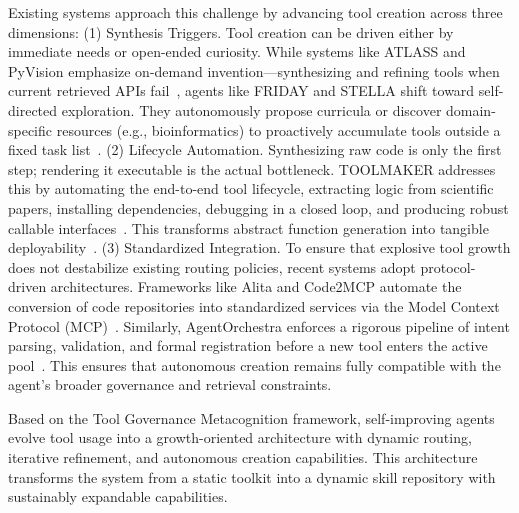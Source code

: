 Existing systems approach this challenge by advancing tool creation across three dimensions: (1) Synthesis Triggers. Tool creation can be driven either by immediate needs or open-ended curiosity. While systems like ATLASS and PyVision emphasize on-demand invention—synthesizing and refining tools  when current retrieved APIs fail~\citep{haque2025advancedtoollearningselection, zhao2025pyvisionagenticvisiondynamic}, agents like FRIDAY and STELLA shift toward self-directed exploration. They autonomously propose curricula or discover domain-specific resources (e.g., bioinformatics) to proactively accumulate tools outside a fixed task list~\citep{wu2024oscopilotgeneralistcomputeragents, jin2025stellaselfevolvingllmagent}. (2) Lifecycle Automation. Synthesizing raw code is only the first step; rendering it executable is the actual bottleneck. TOOLMAKER addresses this by automating the end-to-end tool lifecycle, extracting logic from scientific papers, installing dependencies, debugging in a closed loop, and producing robust callable interfaces~\citep{wölflein2025llmagentsmakingagent}. This transforms abstract function generation into tangible deployability~\citep{cai2024largelanguagemodelstool, yuan2024craftcustomizingllmscreating, qian2024creatortoolcreationdisentangling}. (3) Standardized Integration. To ensure that explosive tool growth does not destabilize existing routing policies, recent systems adopt protocol-driven architectures. Frameworks like Alita and Code2MCP automate the conversion of code repositories into standardized services via the Model Context Protocol (MCP)~\citep{qiu2025alitageneralistagentenabling, qiu2025alitagselfevolvinggenerativeagent, ouyang2025code2mcptransformingcoderepositories}. Similarly, AgentOrchestra enforces a rigorous pipeline of intent parsing, validation, and formal registration before a new tool enters the active pool~\citep{zhang2025agentorchestraorchestratinghierarchicalmultiagent}. This ensures that autonomous creation remains fully compatible with the agent's broader governance and retrieval constraints.



\begin{ttcolorbox}[Takeaway]
Based on the Tool Governance Metacognition framework, self-improving agents evolve tool usage into a growth-oriented architecture with dynamic routing, iterative refinement, and autonomous creation capabilities. This architecture transforms the system from a static toolkit into a dynamic skill repository with sustainably expandable capabilities.
\end{ttcolorbox}


